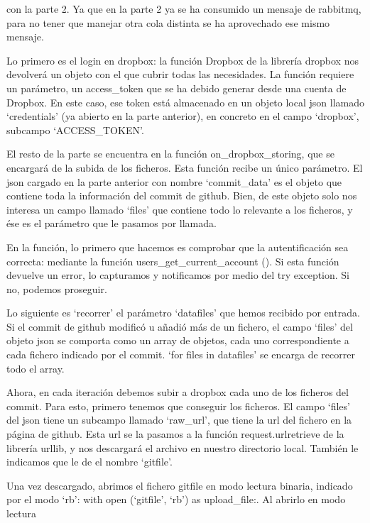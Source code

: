 \documentclass{article}
\begin{document}
\begin{enumerate}
    con la parte 2. Ya que en la parte 2 ya se ha consumido un mensaje de rabbitmq,
    para no tener que manejar otra cola distinta se ha aprovechado ese mismo mensaje. \par
    Lo primero es el login en dropbox: la función Dropbox de la librería dropbox nos devolverá un
    objeto con el que cubrir todas las necesidades. La función requiere un parámetro,
    un access\_token que se ha debido generar desde una cuenta de Dropbox. En este caso,
    ese token está almacenado en un objeto local json llamado `credentials' (ya abierto
    en la parte anterior), en concreto en el campo `dropbox', subcampo `ACCESS\_TOKEN'. \par
    El resto de la parte se encuentra en la función on\_dropbox\_storing, que se encargará de
    la subida de los ficheros. Esta función recibe un único parámetro. El json cargado
    en la parte anterior con nombre `commit\_data' es el objeto que contiene toda la información
    del commit de github. Bien, de este objeto solo nos interesa un campo llamado `files'
    que contiene todo lo relevante a los ficheros, y ése es el parámetro que le pasamos por
    llamada. \par
    En la función, lo primero que hacemos es comprobar que la autentificación sea correcta:
    mediante la función users\_get\_current\_account (). Si esta función devuelve un error,
    lo capturamos y notificamos por medio del try \- exception. Si no, podemos proseguir. \par
    Lo siguiente es `recorrer' el parámetro `datafiles' que hemos recibido por entrada.
    Si el commit de github modificó u añadió más de un fichero, el campo `files' del objeto
    json se comporta como un array de objetos, cada uno correspondiente a cada fichero
    indicado por el commit. `for files in datafiles' se encarga de recorrer todo el array. \par
    Ahora, en cada iteración debemos subir a dropbox cada uno de los ficheros del commit.
    Para esto, primero tenemos que conseguir los ficheros. El campo `files' del json tiene
    un subcampo llamado `raw\_url', que tiene la url del fichero en la página de github.
    Esta url se la pasamos a la función request.urlretrieve de la librería urllib, y
    nos descargará el archivo en nuestro directorio local. También le indicamos que le
    de el nombre `gitfile'.\par
    Una vez descargado, abrimos el fichero gitfile en modo lectura binaria, indicado por
    el modo `rb': with open (`gitfile', `rb') as upload\_file:. Al abrirlo en modo lectura

\end{enumerate}
\end{document}
